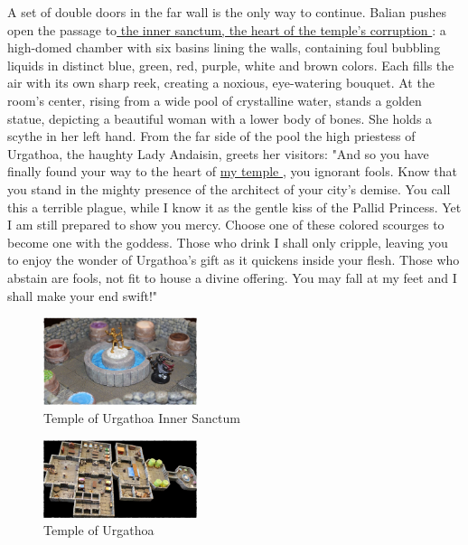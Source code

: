 A set of double doors in the far wall is the only way to continue. Balian pushes open the passage to\hyperref[fig:Temple-of-Urgathoa-Inner-Sanctum-523051443]{ the inner sanctum, the heart of the temple's corruption } : a high-domed chamber with six basins lining the walls, containing foul bubbling liquids in distinct blue, green, red, purple, white and brown colors. Each fills the air with its own sharp reek, creating a noxious, eye-watering bouquet. At the room's center, rising from a wide pool of crystalline water, stands a golden statue, depicting a beautiful woman with a lower body of bones. She holds a scythe in her left hand. From the far side of the pool the high priestess of Urgathoa, the haughty Lady Andaisin, greets her visitors: "And so you have finally found your way to the heart of \hyperref[fig:Temple-of-Urgathoa-523050074]{ my temple } , you ignorant fools. Know that you stand in the mighty presence of the architect of your city's demise. You call this a terrible plague, while I know it as the gentle kiss of the Pallid Princess. Yet I am still prepared to show you mercy. Choose one of these colored scourges to become one with the goddess. Those who drink I shall only cripple, leaving you to enjoy the wonder of Urgathoa's gift as it quickens inside your flesh. Those who abstain are fools, not fit to house a divine offering. You may fall at my feet and I shall make your end swift!" \\

\begin{figure}[h]
	\centering
	\includegraphics[width=0.4\textwidth]{images/Temple-of-Urgathoa-Inner-Sanctum-523051443_mod.jpg}
	\caption{Temple of Urgathoa Inner Sanctum}
	\label{fig:Temple-of-Urgathoa-Inner-Sanctum-523051443}
\end{figure}

\begin{figure}[h]
	\centering
	\includegraphics[width=0.4\textwidth]{images/Temple-of-Urgathoa-523050074_mod.jpg}
	\caption{Temple of Urgathoa}
	\label{fig:Temple-of-Urgathoa-523050074}
\end{figure}


